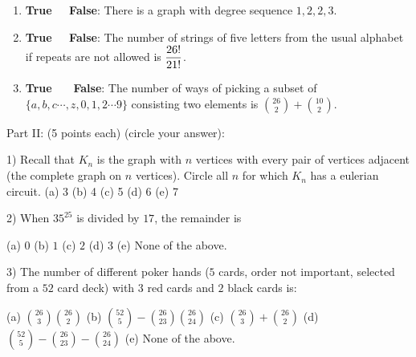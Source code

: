 \documentclass[11pt]{amsart}
\begin{document}
\begin{enumerate}
 \vfill
 
\item  {\bf {\color{red}True} \ \  False}: There is a graph with degree sequence $1,2,2,3$.

\vfill

\item  {\bf {\color{red}True} \ \  False}: The number of strings of five letters from the usual alphabet if repeats are
\vskip -1pt\hskip 83pt  not allowed is $\displaystyle {{26!}\over{21!}}$.

\vfill

\item  {\bf True \ \ {\color{red} False}}:  The number of ways of picking a subset of $\{a,b,c\cdots,z,0,1,2\cdots 9\}$
 consisting
\vskip -1pt\hskip 80pt   two elements is $\displaystyle {{26}\choose{2}} + {{10}\choose{2}}$.

\end{enumerate}

 \vfill
 \break
 
 
 
 
\begin{center} 
Part II: (5 points each)  (circle your answer):
\end{center}

\vfill

1) Recall that $K_n$ is the graph with $n$ vertices with every pair of vertices adjacent \vskip -1pt\hskip 12pt  (the complete graph on $n$ vertices). Circle all $n$ for which $K_{n}$ has a eulerian circuit.
\vskip 5pt
    \hskip 20pt {\color{red}(a) 3 }\hfill
\vskip 5pt
\hskip 20pt (b) 4\hfill
\vskip 5pt
    \hskip 20pt {\color{red} (c) 5}\hfill
\vskip 5pt
\hskip 20pt (d) 6\hfill
\vskip 5pt
\hskip 20pt {\color{red} (e) 7}\hfill

\vfill


2) When $35^{25}$ is divided by $17$, the remainder is

\vskip 5pt
\hskip 20pt (a) $0$\hfill
\vskip 5pt
\hskip 20pt {\color{red}(b) $1$}\hfill
\vskip 5pt
\hskip 20pt (c) $2$\hfill
\vskip 5pt
\hskip 20pt (d) $3$\hfill
\vskip 5pt
\hskip 20pt (e) None of the above.\hfill

\vfill

3) The number of different poker hands ($5$ cards, order not important, selected from a $52$ card
\vskip -1pt\hskip 12pt deck) with $3$ red cards and $2$ black cards is:

\vskip 5pt
\hskip 20pt {\color{red}(a) $\displaystyle{{26}\choose{3}}{{26}\choose{2}}$}\hfill
\vskip 5pt
\hskip 20pt (b) $\displaystyle{{52}\choose{5}} - {{26}\choose{23}}{{26}\choose{24}}$\hfill
\vskip 5pt
\hskip 20pt (c) $\displaystyle{{26}\choose{3}}+{{26}\choose{2}}$
\vskip 5pt
\hskip 20pt (d) $\displaystyle{{52}\choose{5}} - {{26}\choose{23}}-{{26}\choose{24}}$\hfill
\vskip 5pt
\hskip 20pt (e) None of the above.\hfill
\end{document}
